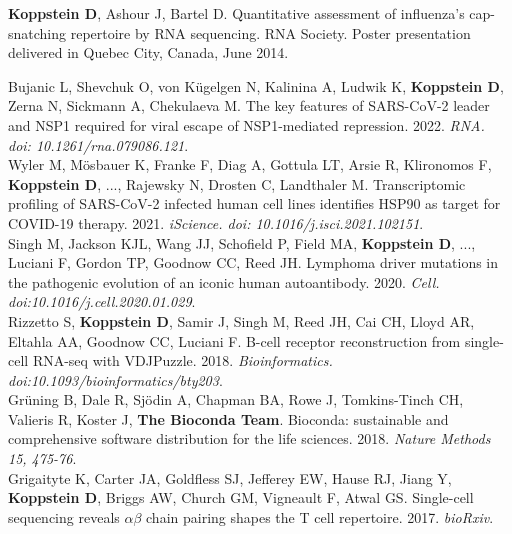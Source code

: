 \documentclass[10pt,a4paper]{article}
\begin{document}
{\noindent \textbf{Koppstein D}, Ashour J, Bartel D. Quantitative assessment of influenza's cap-snatching repertoire by RNA sequencing. RNA Society. Poster presentation delivered in Quebec City, Canada, June 2014.}

\newpage


{\noindent Bujanic L, Shevchuk O, von Kügelgen N, Kalinina A, Ludwik K, \textbf{Koppstein D}, Zerna N, Sickmann A, Chekulaeva M. The key features of SARS-CoV-2 leader and NSP1 required for viral escape of NSP1-mediated repression. 2022. \textit{RNA. doi: 10.1261/rna.079086.121}. \vspace{0.5em} \\ 
{\noindent Wyler M, Mösbauer K, Franke F, Diag A, Gottula LT, Arsie R, Klironomos F, \textbf{Koppstein D}, ..., Rajewsky N, Drosten C, Landthaler M. Transcriptomic profiling of SARS-CoV-2 infected human cell lines identifies HSP90 as target for COVID-19 therapy. 2021. \textit{iScience. doi: 10.1016/j.isci.2021.102151}. \vspace{0.5em} \\
{\noindent Singh M, Jackson KJL, Wang JJ, Schofield P, Field MA, \textbf{Koppstein D}, ..., Luciani F, Gordon TP, Goodnow CC, Reed JH. Lymphoma driver mutations in the pathogenic evolution of an iconic human autoantibody. 2020. \textit{Cell. doi:10.1016/j.cell.2020.01.029}. \vspace{0.5em} \\
{\noindent Rizzetto S, \textbf{Koppstein D}, Samir J, Singh M, Reed JH, Cai CH, Lloyd AR, Eltahla AA, Goodnow CC, Luciani F. B-cell receptor reconstruction from single-cell RNA-seq with VDJPuzzle. 2018. \textit{Bioinformatics. doi:10.1093/bioinformatics/bty203}. \vspace{0.5em} \\
{\noindent Grüning B, Dale R, Sjödin A, Chapman BA, Rowe J, Tomkins-Tinch CH, Valieris R, Koster J, \textbf{The Bioconda Team}. Bioconda: sustainable and comprehensive software distribution for the life sciences. 2018. \textit{Nature Methods 15, 475-76}.} \vspace{0.4em} \\
{\noindent Grigaityte K, Carter JA, Goldfless SJ, Jefferey EW, Hause RJ, Jiang Y, \textbf{Koppstein D}, Briggs AW, Church GM, Vigneault F, Atwal GS. Single-cell sequencing reveals $\alpha \beta$ chain pairing shapes the T cell repertoire. 2017. \textit{bioRxiv}.} \vspace{-0.8em} \\
}}}}
\end{document}
